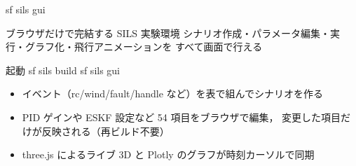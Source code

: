 \begin{frame}[fragile]{sf sils gui}
  \begin{block}{ブラウザだけで完結する SILS 実験環境}\small
    シナリオ作成・パラメータ編集・実行・グラフ化・飛行アニメーションを
    すべて画面で行える
  \end{block}

  \vspace{0.3em}

  \begin{sflisting}[basicstyle=\ttfamily\scriptsize]{起動}
sf sils build
sf sils gui
  \end{sflisting}

  \begin{itemize}\small
    \item イベント（rc/wind/fault/handle など）を表で組んでシナリオを作る
    \item PID ゲインや ESKF 設定など 54 項目をブラウザで編集，
          変更した項目だけが反映される（再ビルド不要）
    \item three.js によるライブ 3D と Plotly のグラフが時刻カーソルで同期
  \end{itemize}
\end{frame}

